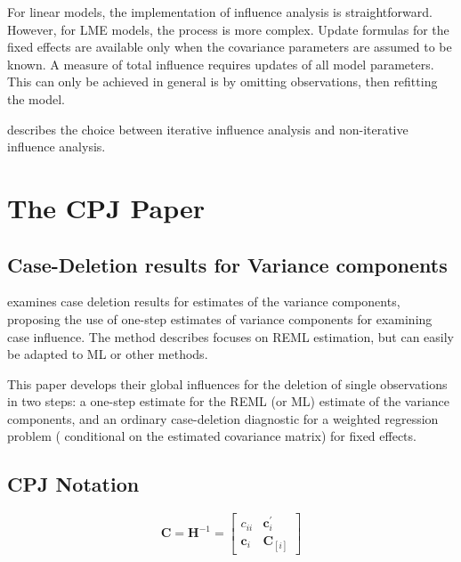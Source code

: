 \documentclass[12pt, a4paper]{report}
\theoremstyle{plain}
\theoremstyle{definition}
\theoremstyle{remark}
\begin{document}
For linear models, the implementation of influence analysis is straightforward.
However, for LME models, the process is more complex. Update formulas for the fixed effects are available only when the covariance parameters are assumed to be known. A measure of total influence requires updates of all model parameters.
This can only be achieved in general is by omitting observations, then refitting the model.

\citet{schabenberger} describes the choice between  iterative influence analysis and  non-iterative influence analysis.


\newpage
\section{The CPJ Paper}%

\subsection{Case-Deletion results for Variance components}
\citet{CPJ} examines case deletion results for estimates of the variance components, proposing the use of one-step estimates of variance components for examining case influence. The method describes focuses on REML estimation, but can easily be adapted to ML or other methods.

This paper develops their global influences for the deletion of single observations in two steps: a one-step estimate for the REML (or ML) estimate of the variance components, and an ordinary case-deletion diagnostic for a weighted regression problem ( conditional on the estimated covariance matrix) for fixed effects.


\subsection{CPJ Notation} %

\[ \boldsymbol{C} = \boldsymbol{H}^{-1} = \left[
\begin{array}{cc}
c_{ii} & \boldsymbol{c}_{i}^{\prime}\\
\boldsymbol{c}_{i} &  \boldsymbol{C}_{[i]}
\end{array} \right]
\]
\end{document}
